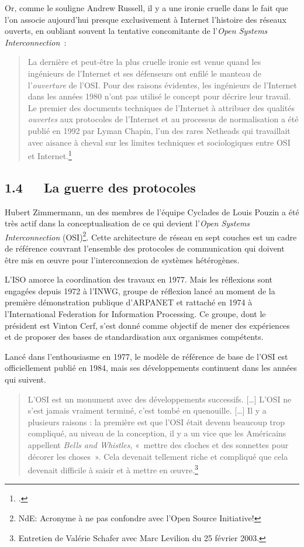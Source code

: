 \documentclass{FramateX}
\begin{document}
\begin{refsection}
Or, comme le souligne Andrew Russell, il y a une ironie cruelle dans le
fait que l'on associe aujourd'hui
presque exclusivement à Internet l'histoire des
réseaux ouverts, en oubliant souvent la tentative concomitante de l'\textit{Open Systems Interconnection~}:

\begin{quote}
La dernière et peut-être la plus cruelle ironie est venue quand les
ingénieurs de l'Internet et ses défenseurs ont enfilé
le manteau de l'\textit{ouverture} de
l'OSI. Pour des raisons évidentes, les ingénieurs de
l'Internet dans les années 1980 n'ont
pas utilisé le concept pour décrire leur travail. Le premier des
documents techniques de l'Internet à attribuer des
qualités \textit{ouvertes} aux protocoles de l'Internet et
au processus de normalisation a été publié en 1992 par Lyman Chapin,
l'un des rares Netheads qui travaillait avec aisance à
cheval sur les limites techniques et sociologiques entre OSI et
Internet.\footnote{\cite{russellopen}.}
\end{quote}

\subsection*{1.4~~~La guerre des protocoles}
{}

Hubert Zimmermann, un des membres de l'équipe Cyclades
de Louis Pouzin a été très actif dans la conceptualisation de ce qui
devient l'\textit{Open Systems
Interconnection} (OSI)\footnote{NdE: Acronyme à ne pas confondre avec l'Open Source Initiative!}. Cette architecture de réseau en sept couches
est un cadre de référence couvrant l'ensemble des
protocoles de communication qui doivent être mis en œuvre pour
l'interconnexion de systèmes hétérogènes. 

L'ISO amorce la coordination des travaux en 1977. Mais
les réflexions sont engagées depuis 1972 à l'INWG,
groupe de réflexion lancé au moment de la première démonstration
publique d'ARPANET et rattaché en 1974 à
l'International Federation for Information
Processing. Ce groupe, dont le président est Vinton Cerf,
s'est donné comme objectif de mener des expériences et
de proposer des bases de standardisation aux organismes compétents. 

Lancé dans l'enthousiasme en 1977, le modèle de
référence de base de l'OSI est officiellement publié
en 1984, mais ses développements continuent dans les années qui
suivent. 
\begin{quote}
L'OSI est un monument avec des développements
successifs. [\ldots] L'OSI ne s'est jamais
vraiment terminé, c'est tombé en quenouille. [\ldots] Il
y a plusieurs raisons : la première est que l'OSI
était devenu beaucoup trop compliqué, au niveau de la conception, il y
a un vice que les Américains appellent \textit{Bells
and Whistles}, «~mettre des cloches
et des sonnettes pour décorer les choses~». Cela
devenait tellement riche et compliqué que cela devenait difficile à
saisir et à mettre en œuvre.\footnote{Entretien de Valérie Schafer avec Marc Levilion du 25 février 2003.}
\end{quote}


\end{refsection}
\end{document}
